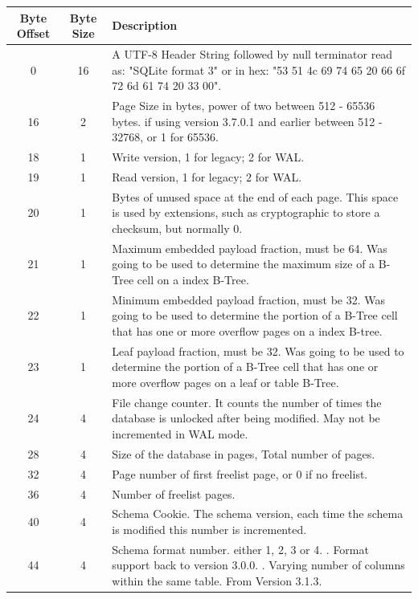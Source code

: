 \begin{longtable}[h]{| c | c | p{10cm} |}
		\hline
			\textbf{Byte Offset} & \textbf{Byte Size} & \textbf{Description} \\ 
		\hline
		\endhead
			0 & 16 & A UTF-8 Header String followed by null terminator read as: "SQLite format 3" or in hex: "53 51 4c 69 74 65 20 66 6f 72 6d 61 74 20 33 00". \\
		\hline
			16 & 2 & Page Size 	in bytes, power of two between 512 - 65536 bytes. if using version 3.7.0.1 and earlier between 512 - 32768, or 1 for 65536. \\
		\hline
			18 & 1 & Write version, 1 for legacy; 2 for WAL. \\
		\hline
			19 & 1 & Read version, 1 for legacy; 2 for WAL. \\
		\hline
			20 & 1 & Bytes of unused space at the end of each page. This space is used by extensions, such as cryptographic to store a checksum, but normally 0. \\
		\hline
			21 & 1 & Maximum embedded payload fraction, must be 64. Was going to be used to determine the maximum size of a B-Tree cell on a index B-Tree. \\
		\hline
			22 & 1 & Minimum embedded payload fraction, must be 32. Was going to be used to determine the portion of a B-Tree cell that has one or more overflow pages on a index B-tree. \\
		\hline
			23 & 1 & Leaf payload fraction, must be 32. Was going to be used to determine the portion of a B-Tree cell that has one or more overflow pages on a leaf or table B-Tree. \\
		\hline
			24 & 4 & File change counter. It counts the number of times the database is unlocked after being modified. May not be incremented in WAL mode. \\
		\hline
			28 & 4 & Size of the database in pages, Total number of pages. \\
		\hline
			32 & 4 & Page number of first freelist page, or 0 if no freelist. \\
		\hline
			36 & 4 & Number of freelist pages. \\
		\hline
			40 & 4 & Schema Cookie. The schema version, each time the schema is modified this number is incremented. \\
		\hline
			44 & 4 & Schema format number. either 1, 2, 3 or 4. \newline
			1. Format support back to version 3.0.0. \newline
			2. Varying number of columns within the same table. From Version 3.1.3. \newline 

\end{longtable}
